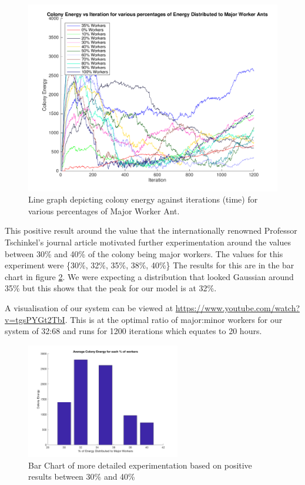\begin{figure}[H]
  \centering
  \includegraphics[width=1\textwidth]{images/line-graph-results.png}
  \caption{Line graph depicting colony energy against iterations (time) for various percentages of Major Worker Ant.}
  \label{fig:iters-line}
\end{figure}

This positive result around the value that the internationally renowned Professor Tschinkel's journal article \cite{Tschinkel1988} motivated further experimentation around the values between 30\% and 40\% of the colony being major workers. The values for this experiment were \{30\%, 32\%, 35\%, 38\%, 40\%\} The results for this are in the bar chart in figure \ref{fig:bar-chart-detail}. We were expecting a distribution that looked Gaussian around 35\% but this shows that the peak for our model is at 32\%.\par
A visualisation of our system can be viewed at \url{https://www.youtube.com/watch?v=tgsPYGt2TbI}. This is at the optimal ratio of major:minor workers for our system of 32:68 and runs for 1200 iterations which equates to 20 hours. 

\begin{figure}[H]
  \centering
  \includegraphics[width=0.6\textwidth]{images/bar-chart-detail.png}
  \caption{Bar Chart of more detailed experimentation based on positive results between 30\% and 40\%}
  \label{fig:bar-chart-detail}
\end{figure}
 

